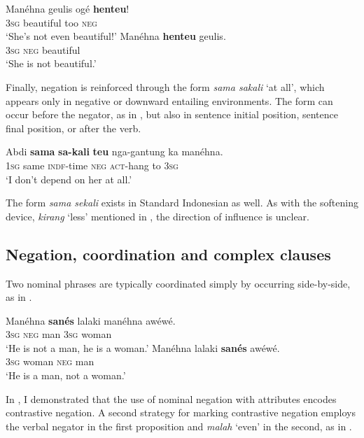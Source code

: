 \documentclass[output=paper]{langscibook}
\begin{document}
\ea\label{ex:sun:56}
    \ea\label{ex:sun:56a}
        \gll  Manéhna geulis ogé \textbf{henteu}!\\ 
              3\textsc{sg} beautiful too \textsc{neg}\\
        \glt ‘She’s not even beautiful!’
    \ex\label{ex:sun:56b}
        \gll Manéhna \textbf{henteu} geulis. \\
              3\textsc{sg} \textsc{neg} beautiful\\
        \glt ‘She is not beautiful.’
    \z
\z 

 Finally, negation is reinforced through the form \textit{sama sakali} ‘at all’, which appears only in negative or downward entailing environments. The form can occur before the negator, as in , but also in sentence initial position, sentence final position, or after the verb. 

\ea\label{ex:sun:57} 
    \gll  Abdi \textbf{sama} \textbf{sa-kali} \textbf{teu} nga-gantung ka manéhna.\\ 
          1\textsc{sg} same \textsc{indf}{}-time \textsc{neg} \textsc{act}{}-hang to 3\textsc{sg}\\
    \glt ‘I don’t depend on her at all.’
\z 

The form \textit{sama sekali} exists in Standard Indonesian as well. As with the softening device, \textit{kirang} ‘less’ mentioned in , the direction of influence is unclear. 

\subsection{Negation, coordination and complex clauses}\label{sec:sun:4.5}

Two nominal phrases are typically coordinated simply by occurring side-by-side, as in . 

\ea\label{ex:sun:58}
    \ea\label{ex:sun:58a}
        \gll  Manéhna \textbf{sanés} lalaki manéhna awéwé.\\ 
              3\textsc{sg} \textsc{neg} man 3\textsc{sg} woman\\
        \glt ‘He is not a man, he is a woman.’
    \ex\label{ex:sun:58b}
        \gll Manéhna lalaki \textbf{sanés} awéwé. \\
              3\textsc{sg} woman \textsc{neg} man\\
        \glt ‘He is a man, not a woman.’
    \z
\z 

In , I demonstrated that the use of nominal negation with attributes encodes contrastive negation. A second strategy for marking contrastive negation employs the verbal negator in the first proposition and \textit{malah} ‘even’ in the second, as in . 
\end{document}
